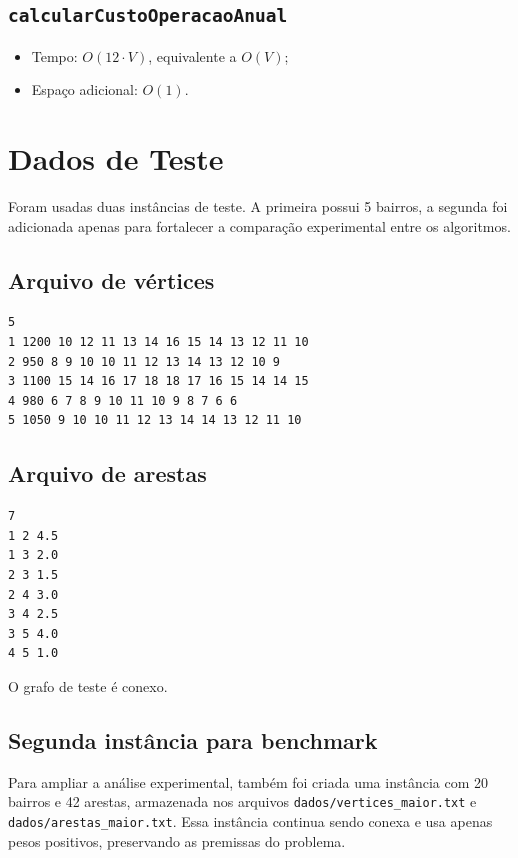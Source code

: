 \documentclass[12pt,a4paper]{article}
\begin{document}
\subsection{\texttt{calcularCustoOperacaoAnual}}

\begin{itemize}[noitemsep]
    \item Tempo: $O(12 \cdot V)$, equivalente a $O(V)$;
    \item Espaço adicional: $O(1)$.
\end{itemize}

\section{Dados de Teste}

Foram usadas duas instâncias de teste. A primeira possui 5 bairros, a segunda
foi adicionada apenas para fortalecer a comparação experimental entre os
algoritmos.

\subsection{Arquivo de vértices}

\begin{lstlisting}
5
1 1200 10 12 11 13 14 16 15 14 13 12 11 10
2 950 8 9 10 10 11 12 13 14 13 12 10 9
3 1100 15 14 16 17 18 18 17 16 15 14 14 15
4 980 6 7 8 9 10 11 10 9 8 7 6 6
5 1050 9 10 10 11 12 13 14 14 13 12 11 10
\end{lstlisting}

\subsection{Arquivo de arestas}

\begin{lstlisting}
7
1 2 4.5
1 3 2.0
2 3 1.5
2 4 3.0
3 4 2.5
3 5 4.0
4 5 1.0
\end{lstlisting}

O grafo de teste é conexo.

\subsection{Segunda instância para benchmark}

Para ampliar a análise experimental, também foi criada uma instância com 20
bairros e 42 arestas, armazenada nos arquivos \texttt{dados/vertices\_maior.txt}
e \texttt{dados/arestas\_maior.txt}. Essa instância continua sendo conexa e usa
apenas pesos positivos, preservando as premissas do problema.
\end{document}
